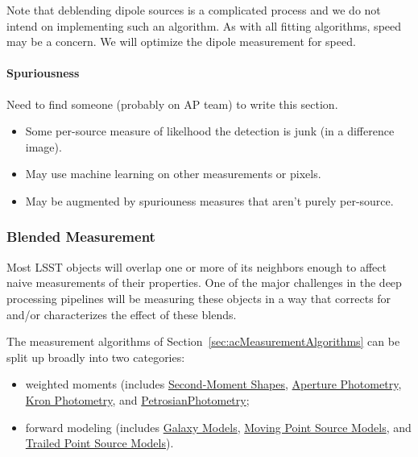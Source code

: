 Note that deblending dipole sources is a complicated process and we do not intend on implementing such an algorithm.  As with all fitting algorithms, speed may be a concern.  We will optimize the dipole measurement for speed.

\paragraph{Spuriousness}
\label{sec:acSpuriousnessAlgorithms}

\begin{note}
Need to find someone (probably on AP team) to write this section.
\end{note}

\begin{itemize}
\item Some per-source measure of likelhood the detection is junk (in a difference image).
\item May use machine learning on other measurements or pixels.
\item May be augmented by spuriouness measures that aren't purely per-source.
\end{itemize}

\subsubsection{Blended Measurement}
\label{sec:acBlendedMeasurement}

Most LSST objects will overlap one or more of its neighbors enough to affect naive measurements of their properties.  One of the major challenges in the deep processing pipelines will be measuring these objects in a way that corrects for and/or characterizes the effect of these blends.

The measurement algorithms of Section~\ref{sec:acMeasurementAlgorithms} can be split up broadly into two categories:
\begin{itemize}
    \item weighted moments (includes \hyperref[sec:acShapeAlgorithms]{Second-Moment Shapes}, \hyperref[sec:acAperturePhotometry]{Aperture Photometry}, \hyperref[sec:acKronPhotometry]{Kron Photometry}, and \hyperref[sec:acPetrosianPhotometry]{PetrosianPhotometry};
    \item forward modeling (includes \hyperref[sec:acGalaxyModels]{Galaxy Models}, \hyperref[sec:acMovingPointSourceModels]{Moving Point Source Models}, and \hyperref[sec:acTrailedPointSourceModels]{Trailed Point Source Models}).
\end{itemize}

